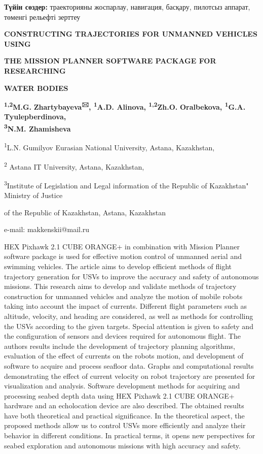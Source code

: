 {\bfseries Түйін сөздер:} траекторияны жоспарлау, навигация, басқару,
пилотсыз аппарат, төменгі рельефті зерттеу

{\bfseries CONSTRUCTING TRAJECTORIES FOR UNMANNED VEHICLES USING}

{\bfseries THE MISSION PLANNER SOFTWARE PACKAGE FOR RESEARCHING}

{\bfseries WATER BODIES}

{\bfseries \textsuperscript{1,2}M.G.}
{\bfseries Zhartybayeva\textsuperscript{🖂}, \textsuperscript{1}A.D.
Alinova, \textsuperscript{1,2}Zh.O.} {\bfseries Oralbekova,
\textsuperscript{1}G.A.} {\bfseries Tyulepberdinova,\\
\textsuperscript{3}N.M. Zhamisheva}

\textsuperscript{1}L.N. Gumilyov Eurasian National University, Astana,
Kazakhstan,

\textsuperscript{2} Astana IT University, Astana, Kazakhstan,

\textsuperscript{3}Institute of Legislation and Legal information of the
Republic of Kazakhstan" Ministry of Justice

of the Republic of Kazakhstan, Astana, Kazakhstan

e-mail: makkenskii@mail.ru

HEX Pixhawk 2.1 CUBE ORANGE+ in combination with Mission Planner
software package is used for effective motion control of unmanned aerial
and swimming vehicles. The article aims to develop efficient methods of
flight trajectory generation for USVs to improve the accuracy and safety
of autonomous missions. This research aims to develop and validate
methods of trajectory construction for unmanned vehicles and analyze the
motion of mobile robots taking into account the impact of currents.
Different flight parameters such as altitude, velocity, and heading are
considered, as well as methods for controlling the USVs according to the
given targets. Special attention is given to safety and the
configuration of sensors and devices required for autonomous flight. The
author\textquotesingle s results include the development of trajectory
planning algorithms, evaluation of the effect of currents on the
robot\textquotesingle s motion, and development of software to acquire
and process seafloor data. Graphs and computational results
demonstrating the effect of current velocity on robot trajectory are
presented for visualization and analysis. Software development methods
for acquiring and processing seabed depth data using HEX Pixhawk 2.1
CUBE ORANGE+ hardware and an echolocation device are also described. The
obtained results have both theoretical and practical significance. In
the theoretical aspect, the proposed methods allow us to control USVs
more efficiently and analyze their behavior in different conditions. In
practical terms, it opens new perspectives for seabed exploration and
autonomous missions with high accuracy and safety.

